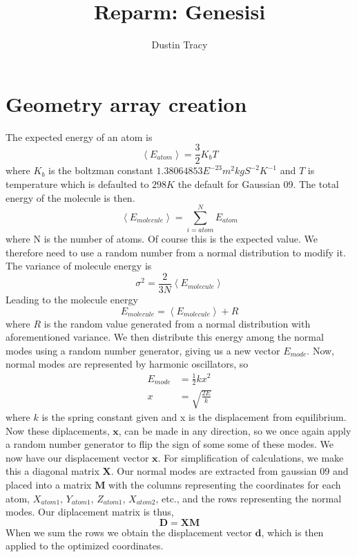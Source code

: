 \message{ !name(genesis.tex)}\documentclass[12pt]{article}
\title{Reparm: Genesisi}
\author{Dustin Tracy}
\begin{document}


\maketitle

\section{Geometry array creation}
The expected energy of an atom is
\begin{equation}
  \label{eq:energy_atom}
  \left<E_{atom}\right>=\frac{3}{2}K_{b}T
\end{equation}
where $K_b$ is the boltzman constant $1.38064853E^{-23}m^2kgS^{-2}K^{-1}$ and $T$ is temperature which is defaulted to $298K$ the default for Gaussian 09.
The total energy of the molecule is then.
\begin{equation}
  \label{eq:energy_molecule}
 \left<E_{molecule}\right>=\sum_{i=atom}^{N}E_{atom}
\end{equation}
where N is the number of atoms.
Of course this is the expected value.
We therefore need to use a random number from a normal distribution to modify it. 
The variance of molecule energy is
\begin{equation}
  \label{eq:energy_variance}
  \sigma^2=\frac{2}{3N}\left<E_{molecule}\right>
\end{equation}
Leading to the molecule energy
\begin{equation}
  \label{eq:adj_molecule_energy}
  E_{molecule}= \left<E_{molecule}\right> + R
\end{equation}
where $R$ is the random value generated from a normal distribution with aforementioned variance.
We then distribute this energy among the normal modes using a random number generator, giving us a new vector $E_{mode}$.
Now, normal modes are represented by harmonic oscillators, so 
\begin{align}
  E_{mode}&=\frac{1}{2}kx^2\\
  x&=\sqrt{\frac{2E}{k}}
\end{align}
where $k$ is the spring constant given  and x is the displacement from equilibrium.
Now these diplacements, $\mathbf{x}$, can be made in any direction, so we once again apply a random number generator to flip the sign of some some of these modes.
We now have our displacement vector $\mathbf{x}$.
For simplification of calculations, we make this a diagonal matrix $\mathbf{X}$.
Our normal modes are extracted from gaussian 09 and placed into a matrix $\mathbf{M}$ with the columns representing the coordinates for each atom, $X_{atom1}$, $Y_{atom1}$, $Z_{atom1}$, $X_{atom2}$, etc., and the rows representing the normal modes.
Our diplacement matrix is thus,
\begin{equation}
  \label{eq:displacement}
 \mathbf{D}=\mathbf{XM} 
\end{equation}
When we sum the rows we obtain the displacement vector $\mathbf{d}$, which is then applied to the optimized coordinates.
\end{document}
